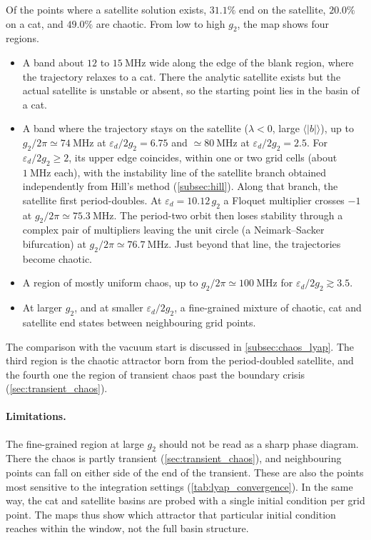 \documentclass[aps,prx,reprint,floatfix,amsmath,amssymb,longbibliography]{revtex4-2}
\begin{document}
Of the points where a satellite solution exists, $31.1\%$ end on the satellite, $20.0\%$ on a cat, and $49.0\%$ are chaotic. From low to high $g_2$, the map shows four regions.
\begin{itemize}
    \item A band about $12$ to $15~\mathrm{MHz}$ wide along the edge of the blank region, where the trajectory relaxes to a cat. There the analytic satellite exists but the actual satellite is unstable or absent, so the starting point lies in the basin of a cat.
    \item A band where the trajectory stays on the satellite ($\lambda < 0$, large $\langle|b|\rangle$), up to $g_2/2\pi \simeq 74~\mathrm{MHz}$ at $\varepsilon_d/2g_2 = 6.75$ and $\simeq 80~\mathrm{MHz}$ at $\varepsilon_d/2g_2 = 2.5$. For $\varepsilon_d/2g_2 \ge 2$, its upper edge coincides, within one or two grid cells (about $1~\mathrm{MHz}$ each), with the instability line of the satellite branch obtained independently from Hill's method (\cref{subsec:hill}). Along that branch, the satellite first period-doubles. At $\varepsilon_d = 10.12\,g_2$ a Floquet multiplier crosses $-1$ at $g_2/2\pi \simeq 75.3~\mathrm{MHz}$. The period-two orbit then loses stability through a complex pair of multipliers leaving the unit circle (a Neimark--Sacker bifurcation) at $g_2/2\pi \simeq 76.7~\mathrm{MHz}$. Just beyond that line, the trajectories become chaotic.
    \item A region of mostly uniform chaos, up to $g_2/2\pi \simeq 100~\mathrm{MHz}$ for $\varepsilon_d/2g_2 \gtrsim 3.5$.
    \item At larger $g_2$, and at smaller $\varepsilon_d/2g_2$, a fine-grained mixture of chaotic, cat and satellite end states between neighbouring grid points.
\end{itemize}
The comparison with the vacuum start is discussed in \cref{subsec:chaos_lyap}. The third region is the chaotic attractor born from the period-doubled satellite, and the fourth one the region of transient chaos past the boundary crisis (\cref{sec:transient_chaos}).

\paragraph*{Limitations.}
The fine-grained region at large $g_2$ should not be read as a sharp phase diagram. There the chaos is partly transient (\cref{sec:transient_chaos}), and neighbouring points can fall on either side of the end of the transient. These are also the points most sensitive to the integration settings (\cref{tab:lyap_convergence}). In the same way, the cat and satellite basins are probed with a single initial condition per grid point. The maps thus show which attractor that particular initial condition reaches within the window, not the full basin structure.
\end{document}
